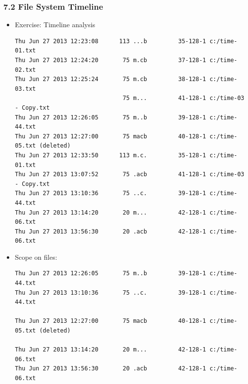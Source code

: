 \begin{frame}[fragile]
  \frametitle{7.2 File System Timeline}
    \begin{itemize}
        \item[] Exercise: Timeline analysis
  \begin{lstlisting}[basicstyle=\tiny]
Thu Jun 27 2013 12:23:08      113 ...b         35-128-1 c:/time-01.txt
Thu Jun 27 2013 12:24:20       75 m.cb         37-128-1 c:/time-02.txt
Thu Jun 27 2013 12:25:24       75 m.cb         38-128-1 c:/time-03.txt
                               75 m...         41-128-1 c:/time-03 - Copy.txt
Thu Jun 27 2013 12:26:05       75 m..b         39-128-1 c:/time-44.txt
Thu Jun 27 2013 12:27:00       75 macb         40-128-1 c:/time-05.txt (deleted)
Thu Jun 27 2013 12:33:50      113 m.c.         35-128-1 c:/time-01.txt
Thu Jun 27 2013 13:07:52       75 .acb         41-128-1 c:/time-03 - Copy.txt
Thu Jun 27 2013 13:10:36       75 ..c.         39-128-1 c:/time-44.txt
Thu Jun 27 2013 13:14:20       20 m...         42-128-1 c:/time-06.txt
Thu Jun 27 2013 13:56:30       20 .acb         42-128-1 c:/time-06.txt
  \end{lstlisting}
        \item[] Scope on files:
  \begin{lstlisting}[basicstyle=\tiny]
Thu Jun 27 2013 12:26:05       75 m..b         39-128-1 c:/time-44.txt
Thu Jun 27 2013 13:10:36       75 ..c.         39-128-1 c:/time-44.txt

Thu Jun 27 2013 12:27:00       75 macb         40-128-1 c:/time-05.txt (deleted)

Thu Jun 27 2013 13:14:20       20 m...         42-128-1 c:/time-06.txt
Thu Jun 27 2013 13:56:30       20 .acb         42-128-1 c:/time-06.txt
  \end{lstlisting}
    \end{itemize}
\end{frame}


